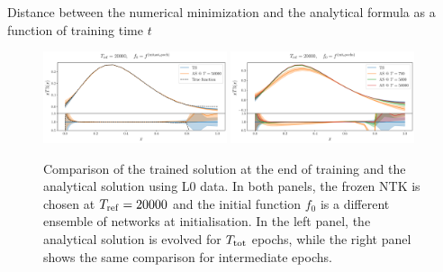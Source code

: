 
Distance between the numerical minimization and the analytical formula as a
function of training time $t$



\newpage


\begin{figure}[ht!]
    \centering
    \includegraphics[width=0.48\textwidth]{plots/analytical_solution/pdf_plot_init_last_epoch_L0.pdf}
    \includegraphics[width=0.48\textwidth]{plots/analytical_solution/pdf_plot_init_epochs_L0.pdf}
    \caption{Comparison of the trained solution at the end of training and
    the analytical solution using L0 data. In both panels, the
    frozen NTK is chosen at $T_{\rm ref} = 20000$ and the initial function $f_0$
    is a different ensemble of networks at initialisation. In the left panel,
    the analytical solution is evolved for $T_{\rm tot}$ epochs, while the right
    panel shows the same comparison for intermediate epochs.}
    \label{fig:xT3_analytical_init_L0}
  \end{figure}
